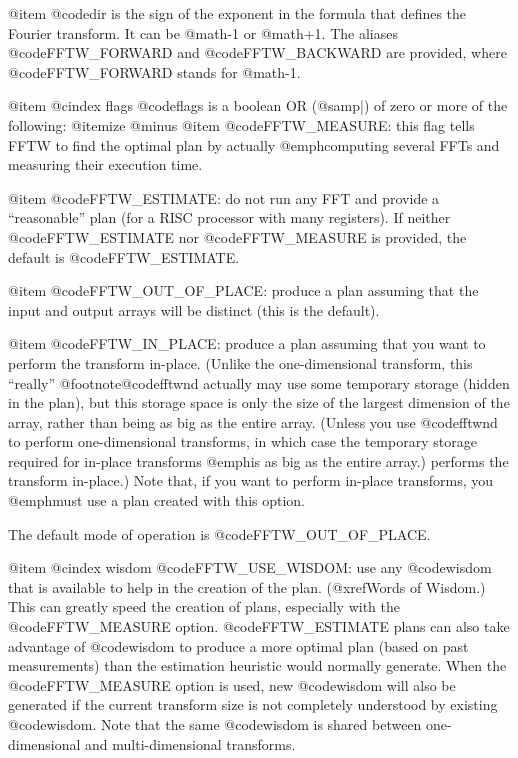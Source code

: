 @item
@code{dir} is the sign of the exponent in the formula that defines the
Fourier transform.  It can be @math{-1} or @math{+1}.  The aliases
@code{FFTW_FORWARD} and @code{FFTW_BACKWARD} are provided, where
@code{FFTW_FORWARD} stands for @math{-1}.

@item
@cindex flags
@code{flags} is a boolean OR (@samp{|}) of zero or more of the following:
@itemize @minus
@item
@code{FFTW_MEASURE}: this flag tells FFTW to find the optimal plan by
actually @emph{computing} several FFTs and measuring their execution
time.

@item
@code{FFTW_ESTIMATE}: do not run any FFT and provide a ``reasonable''
plan (for a RISC processor with many registers).  If neither
@code{FFTW_ESTIMATE} nor @code{FFTW_MEASURE} is provided, the default is
@code{FFTW_ESTIMATE}.

@item
@code{FFTW_OUT_OF_PLACE}: produce a plan assuming that the input
  and output arrays will be distinct (this is the default).

@item
@code{FFTW_IN_PLACE}: produce a plan assuming that you want to perform
the transform in-place.  (Unlike the one-dimensional transform, this
``really'' @footnote{@code{fftwnd} actually may use some temporary
storage (hidden in the plan), but this storage space is only the size of
the largest dimension of the array, rather than being as big as the
entire array.  (Unless you use @code{fftwnd} to perform one-dimensional
transforms, in which case the temporary storage required for in-place
transforms @emph{is} as big as the entire array.)} performs the
transform in-place.) Note that, if you want to perform in-place
transforms, you @emph{must} use a plan created with this option.

The default mode of operation is @code{FFTW_OUT_OF_PLACE}.

@item
@cindex wisdom
@code{FFTW_USE_WISDOM}: use any @code{wisdom} that is available to help
in the creation of the plan. (@xref{Words of Wisdom}.)  This can greatly
speed the creation of plans, especially with the @code{FFTW_MEASURE}
option. @code{FFTW_ESTIMATE} plans can also take advantage of
@code{wisdom} to produce a more optimal plan (based on past
measurements) than the estimation heuristic would normally
generate. When the @code{FFTW_MEASURE} option is used, new @code{wisdom}
will also be generated if the current transform size is not completely
understood by existing @code{wisdom}. Note that the same @code{wisdom}
is shared between one-dimensional and multi-dimensional transforms.

